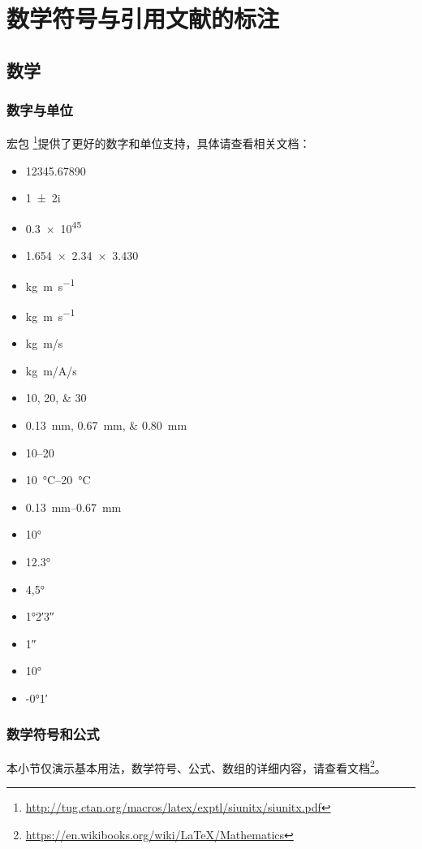 \chapter{数学符号与引用文献的标注}

\section{数学}

\subsection{数字与单位}

宏包  \footnote{\url{http://tug.ctan.org/macros/latex/exptl/siunitx/siunitx.pdf}}提供了更好的数字和单位支持，具体请查看相关文档：
\begin{itemize}
	\item \num{12345,67890}
	\item \num{1+-2i}
	\item \num{.3e45}
	\item \num{1.654 x 2.34 x 3.430}
	\item \si{kg.m.s^{-1}}
	\item \si{\kilogram\metre\per\second}
	\item \si[per-mode=symbol]{\kilogram\metre\per\second}
	\item \si[per-mode=symbol]{\kilogram\metre\per\ampere\per\second}
	\item \numlist{10;20;30}
	\item \SIlist{0.13;0.67;0.80}{\milli\metre}
	\item \numrange{10}{20}
    \item \SIrange{10}{20}{\degreeCelsius}
	\item \SIrange{0.13}{0.67}{\milli\metre}
	\item \ang{10}
	\item \ang{12.3}
	\item \ang{4,5}
	\item \ang{1;2;3}
	\item \ang{;;1}
	\item \ang{+10;;}
	\item \ang{-0;1;}
\end{itemize}

\subsection{数学符号和公式}

本小节仅演示基本用法，数学符号、公式、数组的详细内容，请查看文档\footnote{\url{https://en.wikibooks.org/wiki/LaTeX/Mathematics}}。

